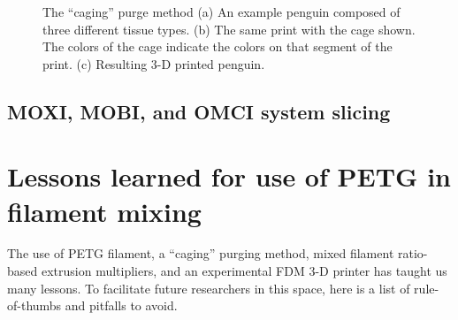 \begin{figure}
	\begin{center}
	\end{center}
	\caption{The ``caging'' purge method (a) An example penguin composed of three different tissue types. (b) The same print with the cage shown. The colors of the cage indicate the colors on that segment of the print. (c) Resulting 3-D printed penguin. } 
	\label{fig:caging}
\end{figure} 

\subsection{MOXI, MOBI, and OMCI system slicing}



\section{Lessons learned for use of PETG in filament mixing}
The use of PETG filament, a ``caging'' purging method, mixed filament ratio-based extrusion multipliers, and an experimental FDM 3-D printer has taught us many lessons. To facilitate future researchers in this space, here is a list of rule-of-thumbs and pitfalls to avoid. 

